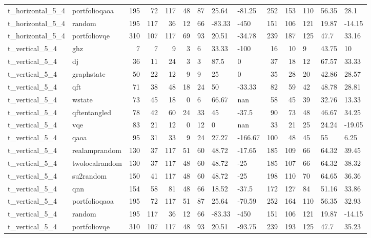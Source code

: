 \begin{longtable}{llrrrrlllrrlll}
t\_horizontal\_5\_4 & portfolioqaoa & 195 & 72 & 117 & 48 & 87 & 25.64 & -81.25 & 252 & 153 & 110 & 56.35 & 28.1 \\
t\_horizontal\_5\_4 & random & 195 & 117 & 36 & 12 & 66 & -83.33 & -450 & 151 & 106 & 121 & 19.87 & -14.15 \\
t\_horizontal\_5\_4 & portfoliovqe & 310 & 107 & 117 & 69 & 93 & 20.51 & -34.78 & 239 & 187 & 125 & 47.7 & 33.16 \\
t\_vertical\_5\_4 & ghz & 7 & 7 & 9 & 3 & 6 & 33.33 & -100 & 16 & 10 & 9 & 43.75 & 10 \\
t\_vertical\_5\_4 & dj & 36 & 11 & 24 & 3 & 3 & 87.5 & 0 & 37 & 18 & 12 & 67.57 & 33.33 \\
t\_vertical\_5\_4 & graphstate & 50 & 22 & 12 & 9 & 9 & 25 & 0 & 35 & 28 & 20 & 42.86 & 28.57 \\
t\_vertical\_5\_4 & qft & 71 & 38 & 48 & 18 & 24 & 50 & -33.33 & 82 & 59 & 42 & 48.78 & 28.81 \\
t\_vertical\_5\_4 & wstate & 73 & 45 & 18 & 0 & 6 & 66.67 & nan & 58 & 45 & 39 & 32.76 & 13.33 \\
t\_vertical\_5\_4 & qftentangled & 78 & 42 & 60 & 24 & 33 & 45 & -37.5 & 90 & 73 & 48 & 46.67 & 34.25 \\
t\_vertical\_5\_4 & vqe & 83 & 21 & 12 & 0 & 12 & 0 & nan & 33 & 21 & 25 & 24.24 & -19.05 \\
t\_vertical\_5\_4 & qaoa & 95 & 31 & 33 & 9 & 24 & 27.27 & -166.67 & 100 & 48 & 45 & 55 & 6.25 \\
t\_vertical\_5\_4 & realamprandom & 130 & 37 & 117 & 51 & 60 & 48.72 & -17.65 & 185 & 109 & 66 & 64.32 & 39.45 \\
t\_vertical\_5\_4 & twolocalrandom & 130 & 37 & 117 & 48 & 60 & 48.72 & -25 & 185 & 107 & 66 & 64.32 & 38.32 \\
t\_vertical\_5\_4 & su2random & 150 & 41 & 117 & 48 & 60 & 48.72 & -25 & 198 & 110 & 70 & 64.65 & 36.36 \\
t\_vertical\_5\_4 & qnn & 154 & 58 & 81 & 48 & 66 & 18.52 & -37.5 & 172 & 127 & 84 & 51.16 & 33.86 \\
t\_vertical\_5\_4 & portfolioqaoa & 195 & 72 & 117 & 51 & 87 & 25.64 & -70.59 & 252 & 164 & 110 & 56.35 & 32.93 \\
t\_vertical\_5\_4 & random & 195 & 117 & 36 & 12 & 66 & -83.33 & -450 & 151 & 106 & 121 & 19.87 & -14.15 \\
t\_vertical\_5\_4 & portfoliovqe & 310 & 107 & 117 & 48 & 93 & 20.51 & -93.75 & 239 & 193 & 125 & 47.7 & 35.23 \\
\end{longtable}
